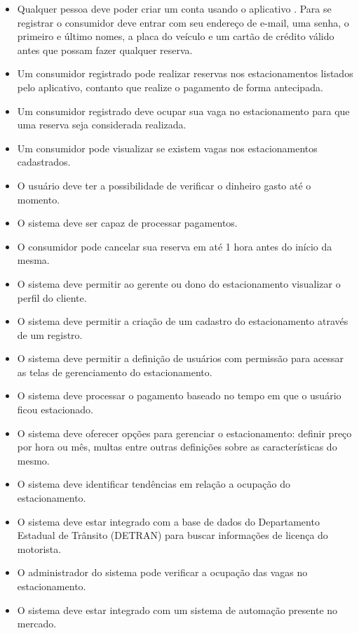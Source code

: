 \begin{itemize}
	\item Qualquer pessoa deve poder criar um conta usando o aplicativo \projectName{}. Para se registrar o consumidor deve entrar com seu endereço de e-mail, uma senha, o primeiro e último nomes, a placa do veículo e um cartão de crédito válido antes que possam fazer qualquer reserva.
	\item Um consumidor registrado pode realizar reservas nos estacionamentos listados pelo aplicativo, contanto que realize o pagamento de forma antecipada.
	\item Um consumidor registrado deve ocupar sua vaga no estacionamento para que uma reserva seja considerada realizada.
	\item Um consumidor pode visualizar se existem vagas nos estacionamentos cadastrados.
	\item O usuário deve ter a possibilidade de verificar o dinheiro gasto até o momento.
	\item O sistema deve ser capaz de processar pagamentos.
	\item O consumidor pode cancelar sua reserva em até 1 hora antes do início da mesma.
	\item O sistema deve permitir ao gerente ou dono do estacionamento visualizar o perfil do cliente.
	\item O sistema deve permitir a criação de um cadastro do estacionamento através de um registro.
	\item O sistema deve permitir a definição de usuários com permissão para acessar as telas de gerenciamento do estacionamento.
	\item O sistema deve processar o pagamento baseado no tempo em que o usuário ficou estacionado.
	\item O sistema deve oferecer opções para gerenciar o estacionamento: definir preço por hora ou mês, multas entre outras definições sobre as características do mesmo.
	\item O sistema deve identificar tendências em relação a ocupação do estacionamento.
	\item O sistema deve estar integrado com a base de dados do Departamento Estadual de Trânsito (DETRAN) para buscar informações de licença do motorista.
	\item O administrador do sistema pode verificar a ocupação das vagas no estacionamento.
	\item O sistema deve estar integrado com um sistema de automação presente no mercado.
\end{itemize}

